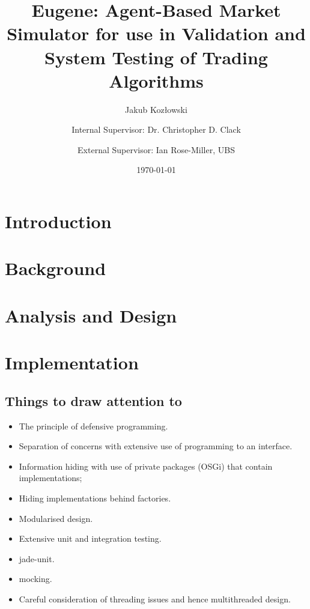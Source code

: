 \documentclass[a4, 11pt, english]{report}
\title{\textbf{Eugene: Agent-Based Market Simulator for use in Validation and System Testing of Trading Algorithms}}
\author{Jakub Koz\l owski \and Internal Supervisor: Dr. Christopher D. Clack \and External Supervisor: Ian Rose-Miller, UBS}
\date{\today}
\begin{document}
\maketitle

\tableofcontents

\pagestyle{fancy}

\begin{onehalfspace}


\chapter{Introduction}
\label{introduction}





\chapter{Background}
\label{background}

\chapter{Analysis and Design}
\label{analysis-and-design}




\chapter{Implementation}
\label{implementation}

\section{Things to draw attention to}
\begin{itemize}
\item The principle of defensive programming.
\item Separation of concerns with extensive use of programming to an interface.
\item Information hiding with use of private packages (OSGi) that contain implementations;
\item Hiding implementations behind factories.
\item Modularised design.
\item Extensive unit and integration testing.
\item jade-unit.
\item mocking.
\item Careful consideration of threading issues and hence multithreaded design.


\end{itemize}
\end{onehalfspace}
\end{document}

